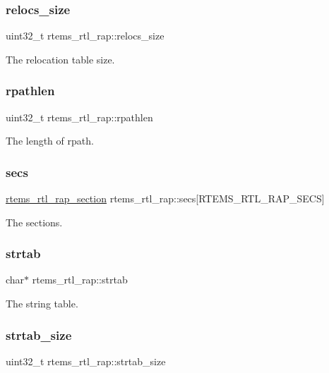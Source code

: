 \subsubsection{\texorpdfstring{relocs\_size}{relocs\_size}}
{\footnotesize\ttfamily uint32\+\_\+t rtems\+\_\+rtl\+\_\+rap\+::relocs\+\_\+size}

The relocation table size. \mbox{\label{structrtems__rtl__rap_abaf47538cc4665f964be70ddf659c29a}} 
\subsubsection{\texorpdfstring{rpathlen}{rpathlen}}
{\footnotesize\ttfamily uint32\+\_\+t rtems\+\_\+rtl\+\_\+rap\+::rpathlen}

The length of rpath. \mbox{\label{structrtems__rtl__rap_a7312f129dd6bc54fde7735a446317488}} 
\subsubsection{\texorpdfstring{secs}{secs}}
{\footnotesize\ttfamily \mbox{\hyperlink{structrtems__rtl__rap__section}{rtems\+\_\+rtl\+\_\+rap\+\_\+section}} rtems\+\_\+rtl\+\_\+rap\+::secs\mbox{[}R\+T\+E\+M\+S\+\_\+\+R\+T\+L\+\_\+\+R\+A\+P\+\_\+\+S\+E\+CS\mbox{]}}

The sections. \mbox{\label{structrtems__rtl__rap_a54673b18eea236d01c11f9c09a9d53a0}} 
\subsubsection{\texorpdfstring{strtab}{strtab}}
{\footnotesize\ttfamily char$\ast$ rtems\+\_\+rtl\+\_\+rap\+::strtab}

The string table. \mbox{\label{structrtems__rtl__rap_a157202d160d54341b1ff39a8db918edd}} 
\subsubsection{\texorpdfstring{strtab\_size}{strtab\_size}}
{\footnotesize\ttfamily uint32\+\_\+t rtems\+\_\+rtl\+\_\+rap\+::strtab\+\_\+size}

